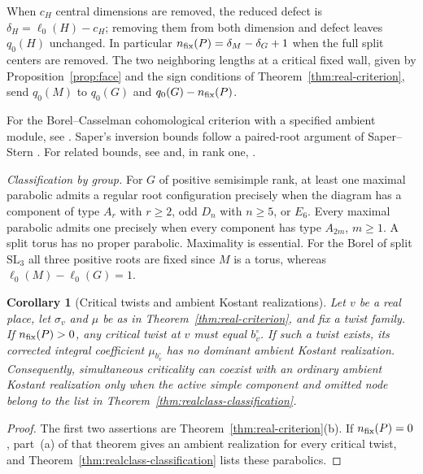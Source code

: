 \documentclass[12pt]{amsart}
\numberwithin{equation}{section}
\theoremstyle{plain}
\newtheorem{corollary}[theorem]{Corollary}
\theoremstyle{definition}
\theoremstyle{remark}
\newcommand{\SL}{\mathrm{SL}}
\begin{document}
When $c_H$ central dimensions are removed, the reduced defect is $\delta_H=\ell_0(H)-c_H$; removing them from both dimension and defect leaves $q_0(H)$ unchanged. In particular $n_{\rm fix}(P)=\delta_M-\delta_G+1$ when the full split centers are removed. The two neighboring lengths at a critical fixed wall, given by Proposition~\ref{prop:face} and the sign conditions of Theorem~\ref{thm:real-criterion}, send $q_0(M)$ to $q_0(G)$ and $q_0(G)-n_{\rm fix}(P)$.

For the Borel--Casselman cohomological criterion with a specified ambient module, see \cite[Prop.~8.9]{SaperMicro}. Saper's inversion bounds \cite[Lemma~17.6]{SaperMicro} follow a paired-root argument of Saper--Stern \cite{SaperStern1990}. For related bounds, see \cite[Lemma~15.2 and Props.~18.2--18.3]{Saper2003} and, in rank one, \cite[Prop.~2.6]{Casselman1983}. 

\emph{Classification by group.}
For $G$ of positive semisimple rank, at least one maximal parabolic admits a regular root configuration precisely when the diagram has a component of type $A_r$ with $r\ge2$, odd $D_n$ with $n\ge5$, or $E_6$. Every maximal parabolic admits one precisely when every component has type $A_{2m}$, $m\ge1$. A split torus has no proper parabolic. Maximality is essential. For the Borel of split $\SL_3$ all three positive roots are fixed since $M$ is a torus, whereas $\ell_0(M)-\ell_0(G)=1$.

\begin{corollary}[Critical twists and ambient Kostant realizations] \label{cor:real-adjacent-pairs}
Let $v$ be a real place, let $\sigma_v$ and $\mu$ be as in Theorem~\ref{thm:real-criterion}, and fix a twist family. If $n_{\rm fix}(P)>0$, any critical twist at $v$ must equal $b_v^\circ$. If such a twist exists, its corrected integral coefficient $\mu_{b_v^\circ}$ has no dominant ambient Kostant realization. Consequently, simultaneous criticality can coexist with an ordinary ambient Kostant realization only when the active simple component and omitted node belong to the list in Theorem~\ref{thm:realclass-classification}. 
\end{corollary}

\begin{proof}
The first two assertions are Theorem~\ref{thm:real-criterion}(b). If $n_{\rm fix}(P)=0$, part~(a) of that theorem gives an ambient realization for every critical twist, and Theorem~\ref{thm:realclass-classification} lists these parabolics. 
\end{proof}
\end{document}
